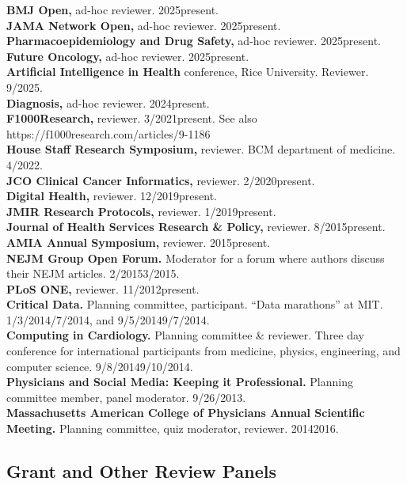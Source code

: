 \documentclass[10pt]{article}
\begin{document}
\textbf{BMJ Open,} ad-hoc reviewer. 2025\ndash{}present.\\
\textbf{JAMA Network Open,} ad-hoc reviewer. 2025\ndash{}present.\\
\textbf{Pharmacoepidemiology and Drug Safety,} ad-hoc reviewer.
2025\ndash{}present.\\
\textbf{Future Oncology,} ad-hoc reviewer. 2025\ndash{}present.\\
\textbf{Artificial Intelligence in Health} conference, Rice
University. Reviewer. 9/2025.\\
\textbf{Diagnosis,} ad-hoc reviewer. 2024\ndash{}present.\\
\textbf{F1000Research,} reviewer. 3/2021\ndash{}present. See also
https://f1000research.com/articles/9-1186\\
\textbf{House Staff Research Symposium,} reviewer. BCM department of
medicine. 4/2022.\\
\textbf{JCO Clinical Cancer Informatics,} reviewer.
2/2020\ndash{}present.\\
\textbf{Digital Health,} reviewer. 12/2019\ndash{}present.\\
\textbf{JMIR Research Protocols,} reviewer. 1/2019\ndash{}present.\\
\textbf{Journal of Health Services Research \& Policy,} reviewer.
8/2015\ndash{}present.\\
\textbf{AMIA Annual Symposium,} reviewer. 2015\ndash{}present.\\
\textbf{NEJM Group Open Forum.} Moderator for a forum where
authors discuss their NEJM articles. 2/2015\ndash{}3/2015.\\
\textbf{PLoS ONE,} reviewer. 11/2012\ndash{}present.\\
\textbf{Critical Data.} Planning committee, participant. ``Data
marathons'' at MIT. 1/3/2014\ndash{}/7/2014, and
9/5/2014\ndash{}9/7/2014.\\
\textbf{Computing in Cardiology.} Planning committee \& reviewer.
Three day conference for international participants from medicine,
physics, engineering, and computer science.
9/8/2014\ndash{}9/10/2014.\\
\textbf{Physicians and Social Media: Keeping it Professional.}
Planning committee member, panel moderator. 9/26/2013.\\
\textbf{Massachusetts American College of Physicians Annual Scientific
  Meeting.} Planning committee, quiz moderator, reviewer.
2014\ndash{}2016.

\subsection{Grant and Other Review Panels}  %
\end{document}
